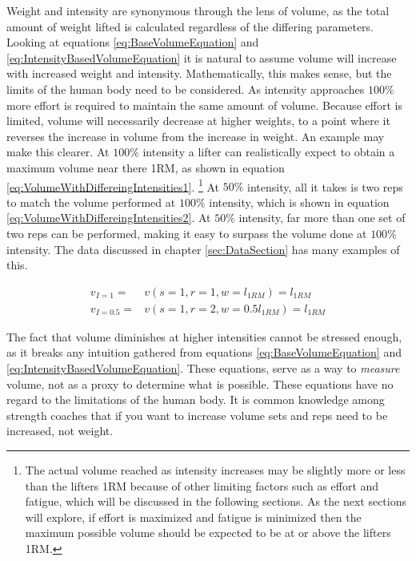 Weight and intensity are synonymous through the lens of volume, as the total amount of weight lifted is calculated regardless of the differing parameters. Looking at equations \ref{eq:BaseVolumeEquation} and \ref{eq:IntensityBasedVolumeEquation} it is natural to assume volume will increase with increased weight and intensity. Mathematically, this makes sense, but the limits of the human body need to be considered. As intensity approaches $100\%$ more effort is required to maintain the same amount of volume. Because effort is limited, volume will necessarily decrease at higher weights, to a point where it reverses the increase in volume from the increase in weight. An example may make this clearer. At $100\%$ intensity a lifter can realistically expect to obtain a maximum volume near there 1RM, as shown in equation \ref{eq:VolumeWithDiffereingIntensities1}. \footnote{The actual volume reached as intensity increases may be slightly more or less than the lifters 1RM because of other limiting factors such as effort and fatigue, which will be discussed in the following sections. As the next sections will explore, if effort is maximized and fatigue is minimized then the maximum possible volume should be expected to be at or above the lifters 1RM.} At $50\%$ intensity, all it takes is two reps to match the volume performed at $100\%$ intensity, which is shown in equation \ref{eq:VolumeWithDiffereingIntensities2}. At $50\%$ intensity, far more than one set of two reps can be performed, making it easy to surpass the volume done at $100\%$ intensity. The data discussed in chapter \ref{sec:DataSection} has many examples of this.

\begin{subequations}
    \begin{align}
        \label{eq:VolumeWithDiffereingIntensities1}
        v_{I=1}=&v(s=1,r=1,w=l_{1RM})=l_{1RM} \\
        \label{eq:VolumeWithDiffereingIntensities2}
        v_{I=0.5}=&v(s=1,r=2,w=0.5l_{1RM})=l_{1RM}
    \end{align}
\end{subequations}

The fact that volume diminishes at higher intensities cannot be stressed enough, as it breaks any intuition gathered from equations \ref{eq:BaseVolumeEquation} and \ref{eq:IntensityBasedVolumeEquation}. These equations, serve as a way to \textit{measure} volume, not as a proxy to determine what is possible. These equations have no regard to the limitations of the human body. It is common knowledge among strength coaches that if you want to increase volume sets and reps need to be increased, not weight.

